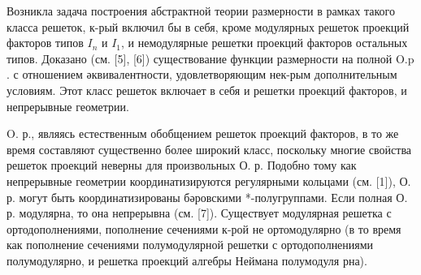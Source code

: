 \documentclass[10pt]{article}
\begin{document}
Возникла задача построения абстрактной теории размерности в рамках такого класса решеток, к-рый включил бы в себя, кроме модулярных решеток проекций факторов типов $I_{n}$ и $I_{1}$, и немодулярные решетки проекций факторов остальных типов. Доказано (см. [5], [6]) существование функции размерности на полной $\mathrm{O} . \mathrm{p}$. с отношением әквивалентности, удовлетворяющим нек-рым дополнительным условиям. Этот класс решеток включает в себя и решетки проекций факторов, и непрерывные геометрии.



O. р., являясь естественным обобщением решеток проекций факторов, в то же время составляют существенно более широкий класс, поскольку многие своӥства решеток проекций неверны для произвольных О. р. Подобно тому как непрерывные геометрии координатизируются регулярными кольцами (см. [1]), О. р. могут быть координатизированы бәровскими *-полугруппами. Если полная О. р. модулярна, то она непрерывна (см. [7]). Существует модулярная решетка с ортодополнениями, пополнение сечениями к-рой не ортомодулярно (в то время как пополнение сечениями полумодулярной решетки с ортодополнениями полумодулярно, и решетка проекций алгебры Неймана полумодуля рна).
\end{document}
